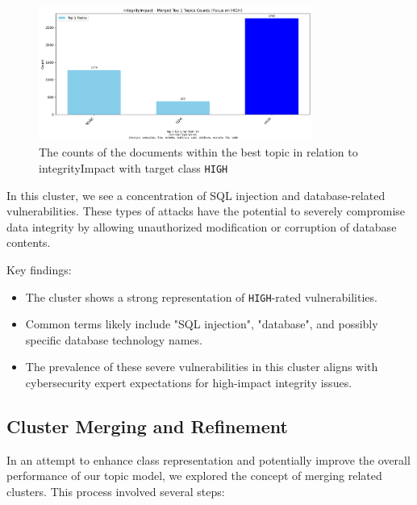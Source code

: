 \documentclass[12pt]{article}
\begin{document}
\begin{figure}[ht]
	\centering
	\includegraphics[width=0.8\textwidth]{figures/integrityImpact/merged_top_k_topics_category_focus_counts_integrityImpact_HIGH_k1.png}
	\caption{The counts of the documents within the best topic in relation to integrityImpact with target class \texttt{HIGH}}
	\label{fig:integrityImpact_20_HIGH}
\end{figure}

In this cluster, we see a concentration of SQL injection and database-related vulnerabilities. These
types of attacks have the potential to severely compromise data integrity by allowing unauthorized
modification or corruption of database contents.

Key findings:
\begin{itemize}

	\item The cluster shows a strong representation of \texttt{HIGH}-rated vulnerabilities.

	\item Common terms likely include "SQL injection", "database", and possibly specific database
	      technology names.

	\item The prevalence of these severe vulnerabilities in this cluster aligns with cybersecurity
	      expert expectations for high-impact integrity issues.

\end{itemize}

\subsection{Cluster Merging and Refinement}

In an attempt to enhance class representation and potentially improve the overall performance of our topic model, we explored the concept of merging related clusters. This process involved several steps:
\end{document}
